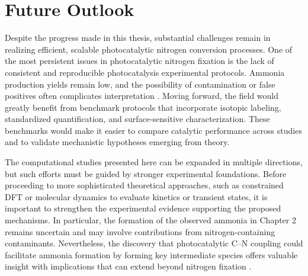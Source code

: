 

\section{Future Outlook}
Despite the progress made in this thesis, substantial challenges remain in realizing efficient, scalable photocatalytic nitrogen conversion processes. One of the most persistent issues in photocatalytic nitrogen fixation is the lack of consistent and reproducible photocatalysis experimental protocols. Ammonia production yields remain low, and the possibility of contamination or false positives often complicates interpretation \cite{Huang2024BenchmarkingReaction}. Moving forward, the field would greatly benefit from benchmark protocols that incorporate isotopic labeling, standardized quantification, and surface-sensitive characterization. These benchmarks would make it easier to compare catalytic performance across studies and to validate mechanistic hypotheses emerging from theory.

The computational studies presented here can be expanded in multiple directions, but such efforts must be guided by stronger experimental foundations. Before proceeding to more sophisticated theoretical approaches, such as constrained DFT or molecular dynamics to evaluate kinetics or transient states, it is important to strengthen the experimental evidence supporting the proposed mechanisms. In particular, the formation of the observed ammonia in Chapter 2 remains uncertain and may involve contributions from nitrogen-containing contaminants. Nevertheless, the discovery that photocatalytic C–N coupling could facilitate ammonia formation by forming key intermediate species offers valuable insight with implications that can extend beyond nitrogen fixation \cite{Li2025PhotocatalyticSynthesis, tao2021accessing, Wang2022RealizingIntermediates, Li2023ElectrosynthesisReactors}.


